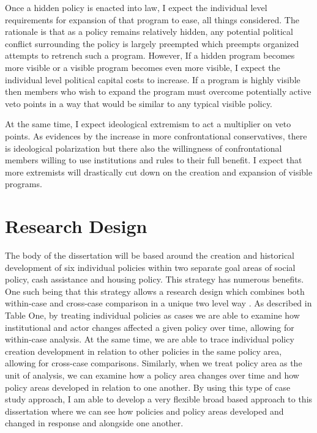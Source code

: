 \documentclass[12pt]{article}
\begin{document}
Once a hidden policy is enacted into law, I expect the individual level requirements for expansion of that program to ease, all things considered. The rationale is that as a policy remains relatively hidden, any potential political conflict surrounding the policy is largely preempted which preempts organized attempts to retrench such a program. However, If a hidden program becomes more visible or a visible program becomes even more visible, I expect the individual level political capital costs to increase. If a program is highly visible then members who wish to expand the program must overcome potentially active veto points in a way that would be similar to any typical visible policy.


At the same time, I expect ideological extremism to act a multiplier on veto points. As evidences by the increase in more confrontational conservatives, there is ideological polarization but there also the willingness of confrontational members willing to use institutions and rules to their full benefit. I expect that more extremists will drastically cut down on the creation and expansion of visible programs.

\section{Research Design}
The body of the dissertation will be based around the creation and historical development of six individual policies within two separate goal areas of social policy, cash assistance and housing policy. This strategy has numerous benefits. One such being that this strategy allows a research design which combines both within-case and cross-case comparison in a unique two level way \citep{george2005, goertz2012}. As described in Table One, by treating individual policies as cases we are able to examine how institutional and actor changes affected a given policy over time, allowing for within-case analysis. At the same time, we are able to trace individual policy creation development in relation to other policies in the same policy area, allowing for cross-case comparisons. Similarly, when we treat policy area as the unit of analysis, we can examine how a policy area changes over time and how policy areas developed in relation to one another. By using this type of case study approach, I am able to develop a very flexible broad based approach to this dissertation where we can see how policies and policy areas developed and changed in response and alongside one another. 
\end{document}
